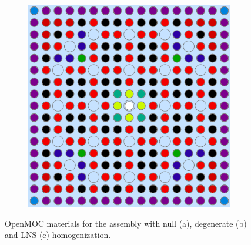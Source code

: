 \begin{figure}[h!]
\begin{subfigure}{0.33\textwidth}
  \caption{}
  \label{fig:degenerate-assm}
\end{subfigure}
\begin{subfigure}{0.33\textwidth}
  \centering
  \includegraphics[width=0.9\linewidth]{figures/assembly/lns-materials}
  \caption{}
  \label{fig:lns-assm}
\end{subfigure}
\caption{OpenMOC materials for the assembly with null (a), degenerate (b) and LNS (c) homogenization.}
\label{fig:benchmarks-assm}
\end{figure}

